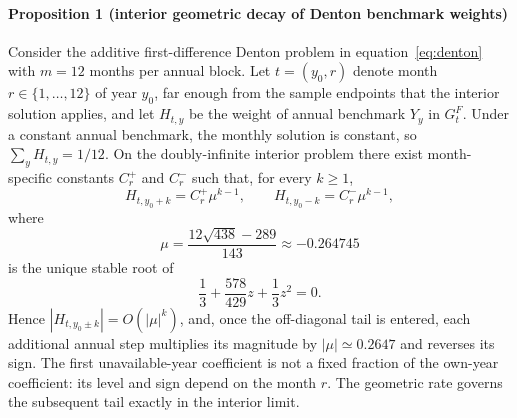 \documentclass[preprint,12pt,authoryear]{elsarticle}
\begin{document}
\paragraph{Proposition 1 (interior geometric decay of Denton benchmark
weights)}
Consider the additive first-difference Denton problem in
equation~\eqref{eq:denton} with $m=12$ months per annual block. Let
$t = (y_0, r)$ denote month $r \in \{1,\dots,12\}$ of year $y_0$, far enough
from the sample endpoints that the interior solution applies, and let $H_{t,y}$
be the weight of annual benchmark $Y_y$ in $G^F_t$. Under a constant annual
benchmark, the monthly solution is constant, so $\sum_y H_{t,y} = 1/12$. On
the doubly-infinite interior problem there exist month-specific constants
$C_r^{+}$ and $C_r^{-}$ such that, for every $k \geq 1$,
\begin{equation}
H_{t,y_0+k} = C_r^{+} \mu^{k-1}, \qquad
H_{t,y_0-k} = C_r^{-} \mu^{k-1},
\label{eq:denton_tail}
\end{equation}
where
\begin{equation}
\mu = \frac{12\sqrt{438}-289}{143} \approx -0.264745
\label{eq:denton_mu}
\end{equation}
is the unique stable root of
\begin{equation}
\frac{1}{3} + \frac{578}{429}z + \frac{1}{3}z^2 = 0.
\label{eq:denton_characteristic}
\end{equation}
Hence $|H_{t,y_0 \pm k}| = O(|\mu|^k)$, and, once the off-diagonal tail is
entered, each additional annual step multiplies its magnitude by
$|\mu| \simeq 0.2647$ and reverses its sign. The first unavailable-year
coefficient is not a fixed fraction of the own-year coefficient: its level and
sign depend on the month $r$. The geometric rate governs the subsequent tail
exactly in the interior limit.
\end{document}
